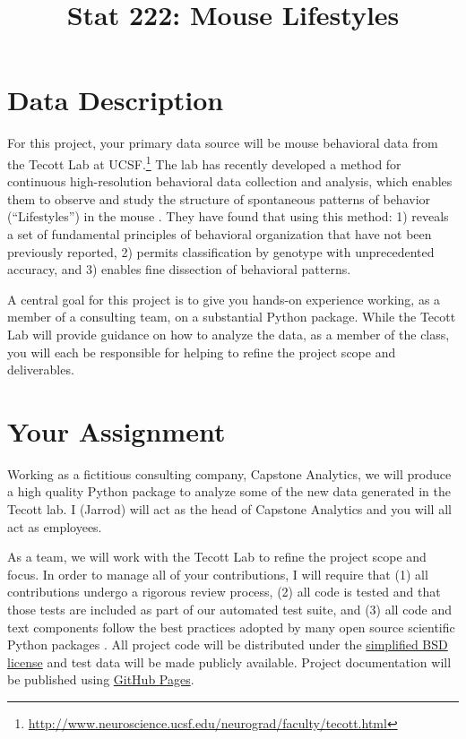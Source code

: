 \documentclass[11pt, oneside]{article}   	%
\title{Stat 222: Mouse Lifestyles}
\begin{document}
\maketitle

\section{Data Description}

For this project, your primary data source will be mouse behavioral data from
the Tecott Lab at
UCSF.\footnote{\url{http://www.neuroscience.ucsf.edu/neurograd/faculty/tecott.html}}
The lab has recently developed a method for continuous high-resolution
behavioral data collection and analysis, which enables them to observe and
study the structure of spontaneous patterns of behavior (``Lifestyles'') in the
mouse \cite{tecott2003genes, tecott2004neurobehavioral, goulding2008robust,
hillar2016activestate}.  They have found that using this method: 1) reveals a
set of fundamental principles of behavioral organization that have not been
previously reported, 2) permits classification by genotype with unprecedented
accuracy, and 3) enables fine dissection of behavioral patterns.

A central goal for this project is to give you hands-on experience working,
as a member of a consulting team, on a substantial Python package.  While the
Tecott Lab will provide guidance on how to analyze the data, as a member of
the class, you will each be responsible for helping to refine the project
scope and deliverables.

\section{Your Assignment}

Working as a fictitious consulting company, Capstone Analytics, we will produce
a high quality Python package to analyze some of the new data generated in the
Tecott lab.  I (Jarrod) will act as the head of Capstone Analytics and you will
all act as employees. 

As a team, we will work with the Tecott Lab to refine the project scope and
focus.  In order to manage all of your contributions, I will require that (1)
all contributions undergo a rigorous review process, (2) all code is tested and
that those tests are included as part of our automated test suite, and (3) all
code and text components follow the best practices adopted by many open source
scientific Python packages \cite{millman2014developing}.  All project code will
be distributed under the
\href{https://en.wikipedia.org/wiki/BSD_licenses\#2-clause_license_.28.22Simplified_BSD_License.22_or_.22FreeBSD_License.22.29}{simplified BSD license}
and test data will be made publicly available.  Project documentation will
be published using \href{https://pages.github.com/}{GitHub Pages}.
\end{document}

